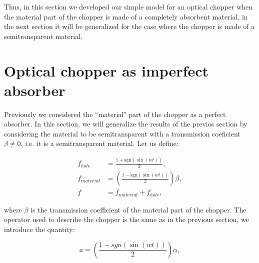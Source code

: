 \documentclass[12pt]{book}
\begin{document}
Thus, in this section we developed our simple model for an optical chopper when the material part of the chopper is made of a completely absorbent material, in the next section it will be generalized for the case where the chopper is made of a semitransparent material.

\section{Optical chopper as imperfect absorber}

Previously we considered the ``material" part of the chopper as a perfect absorber. In this section,  we will generalize the results of the previos section by considering the material to be semitransparent with a transmission coeficient $\beta \neq 0$, i.e. it is a semitransparent material. Let us define: 
 

\begin{align}
f_{hole}&=\frac{1+\mathrm{sgn}(\sin(wt))}{2},\label{beta111}\\
f_{material}&=\left(\frac{1-\mathrm{sgn}(\sin(wt))}{2} \right)\beta,\label{beta11}\\
f&=f_{material}+f_{hole}, \label{beta1}
\end{align}


where $\beta$ is the transmission coefficient of the material part of the chopper. The operator used to describe the chopper is the same as in the previous section, we introduce the quantity:


\begin{equation}
a=\left(\frac{1-sgn(\sin(wt))}{2}\right) \alpha,
\end{equation}
\end{document}
